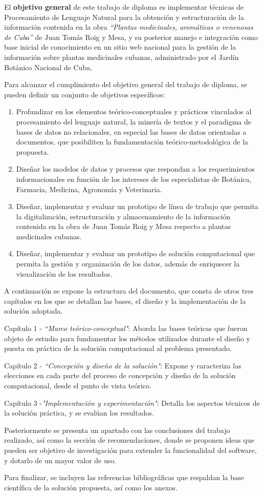 El \textbf{objetivo general} de este trabajo de diploma es implementar técnicas 
de Procesamiento de Lenguaje Natural para la obtención y estructuración de la información 
contenida en la obra \textit{``Plantas medicinales, aromáticas o venenosas de Cuba''} de 
Juan Tomás Roig y Mesa, y su posterior manejo e integración como base inicial de conocimiento 
en un sitio web nacional para la gestión de la información sobre plantas medicinales cubanas, 
administrado por el Jardín Botánico Nacional de Cuba.

Para alcanzar el cumplimiento del objetivo general del trabajo de diploma, se pueden 
definir un conjunto de objetivos específicos:
\begin{enumerate}
    \item Profundizar en los elementos teórico-conceptuales y prácticos vinculados al 
    procesamiento del lenguaje natural, la minería de textos y el paradigma de 
    bases de datos no relacionales, en especial las bases de datos orientadas 
    a documentos, que posibiliten la fundamentación teórico-metodológica de la propuesta.
    \item Diseñar los modelos de datos y procesos que respondan a los requerimientos 
    informacionales en función de los intereses de los especialistas de Botánica, 
    Farmacia, Medicina, Agronomía y Veterinaria.
    \item Diseñar, implementar y evaluar un prototipo de línea de trabajo que permita 
    la digitalización, estructuración y almacenamiento de la información contenida 
    en la obra de Juan Tomás Roig y Mesa respecto a plantas medicinales cubanas.
    \item Diseñar, implementar y evaluar un prototipo de solución computacional que 
    permita la gestión y organización de los datos, además de enriquecer la visualización 
    de los resultados.
\end{enumerate}

A continuación se expone la estructura del documento, que consta de otros tres capítulos 
en los que se detallan las bases, el diseño y la implementación de la solución adoptada.

Capítulo 1 - \textit{``Marco teórico-conceptual"}: Aborda las bases teóricas que fueron 
objeto de estudio para fundamentar los métodos utilizados durante el diseño y puesta en 
práctica de la solución computacional al problema presentado.

Capítulo 2 - \textit{``Concepción y diseño de la solución"}: Expone y caracteriza las 
elecciones en cada parte del proceso de concepción y diseño de la solución computacional, 
desde el punto de vista teórico.

Capítulo 3 -\textit{"Implementación y experimentación"}: Detalla los aspectos técnicos 
de la solución práctica, y se evalúan los resultados.

Posteriormente se presenta un apartado con las conclusiones del trabajo realizado, 
así como la sección de recomendaciones, donde se proponen ideas que pueden ser objetivo 
de investigación para extender la funcionalidad del software, y dotarlo de un mayor 
valor de uso.

Para finalizar, se incluyen las referencias bibliográficas que respaldan la base 
científica de la solución propuesta, así como los anexos.